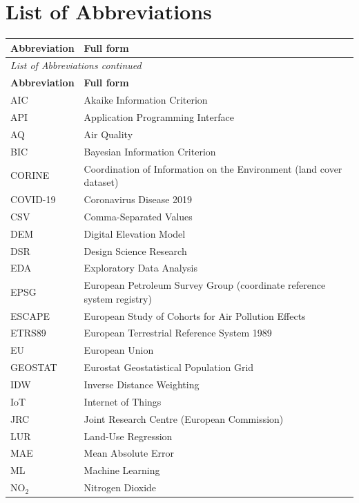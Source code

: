 \documentclass[11pt,a4paper]{article}
\let\oldsection\section
\renewcommand{\section}{\FloatBarrier\oldsection}
\begin{document}
\section*{List of Abbreviations}

\begin{longtable}{p{2.6cm}p{11.5cm}}
\toprule
\textbf{Abbreviation} & \textbf{Full form} \\
\midrule
\endfirsthead
\multicolumn{2}{l}{\textit{List of Abbreviations continued}} \\
\toprule
\textbf{Abbreviation} & \textbf{Full form} \\
\midrule
\endhead
\bottomrule
\endfoot
AIC & Akaike Information Criterion \\
API & Application Programming Interface \\
AQ & Air Quality \\
BIC & Bayesian Information Criterion \\
CORINE & Coordination of Information on the Environment (land cover dataset) \\
COVID-19 & Coronavirus Disease 2019 \\
CSV & Comma-Separated Values \\
DEM & Digital Elevation Model \\
DSR & Design Science Research \\
EDA & Exploratory Data Analysis \\
EPSG & European Petroleum Survey Group (coordinate reference system registry) \\
ESCAPE & European Study of Cohorts for Air Pollution Effects \\
ETRS89 & European Terrestrial Reference System 1989 \\
EU & European Union \\
GEOSTAT & Eurostat Geostatistical Population Grid \\
IDW & Inverse Distance Weighting \\
IoT & Internet of Things \\
JRC & Joint Research Centre (European Commission) \\
LUR & Land-Use Regression \\
MAE & Mean Absolute Error \\
ML & Machine Learning \\
NO$_2$ & Nitrogen Dioxide \\

\end{longtable}
\end{document}
